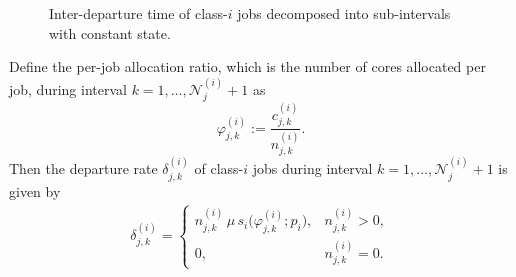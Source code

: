 \documentclass[11pt]{article}
\theoremstyle{remark}
\theoremstyle{definition}
\numberwithin{equation}{section}
\begin{document}
\begin{figure}[htbp]
\centering
    \caption{Inter-departure time of class-$i$ jobs decomposed into sub-intervals with constant state.}
    \label{fig:event times}
\end{figure}



Define the per-job allocation ratio, which is the number of cores allocated per job, during interval $k=1,\ldots,\mathscr N^{(i)}_{j}+1$ as
\[
\varphi^{(i)}_{j,k} := \frac{c^{(i)}_{j,k}}{n^{(i)}_{j,k}}.
\]
Then the departure rate $\delta^{(i)}_{j,k}$ of class-$i$ jobs during interval $k=1,\ldots,\mathscr N^{(i)}_{j}+1$ is given by
\begin{align*}
    \delta^{(i)}_{j,k} = 
    \begin{cases}
        n^{(i)}_{j,k} \, \mu \, s_i\Big(\varphi^{(i)}_{j,k};p_i\Big), &n^{(i)}_{j,k} > 0,
        \\
        0, &n^{(i)}_{j,k} = 0.
    \end{cases}
\end{align*}
\end{document}
